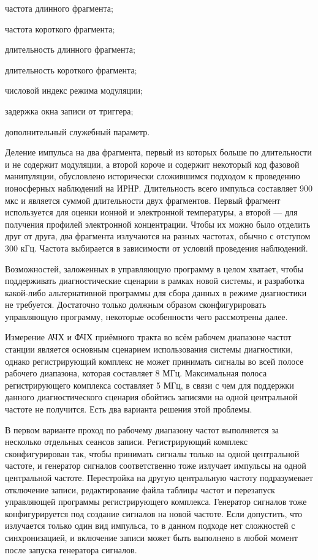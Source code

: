 \documentclass{report}
\begin{document}
\begin{enummarker}
    \item частота длинного фрагмента;
    \item частота короткого фрагмента;
    \item длительность длинного фрагмента;
    \item длительность короткого фрагмента;
    \item числовой индекс режима модуляции;
    \item задержка окна записи от триггера;
    \item дополнительный служебный параметр.
\end{enummarker}

Деление импульса на два фрагмента, первый из которых больше по длительности и не содержит модуляции, а второй короче и содержит некоторый код фазовой манипуляции, обусловлено исторически сложившимся подходом к проведению ионосферных наблюдений на ИРНР. Длительность всего импульса составляет 900 мкс и является суммой длительности двух фрагментов. Первый фрагмент используется для оценки ионной и электронной температуры, а второй --- для получения профилей электронной концентрации. Чтобы их можно было отделить друг от друга, два фрагмента излучаются на разных частотах, обычно с отступом 300 кГц. Частота выбирается в зависимости от условий проведения наблюдений.

Возможностей, заложенных в управляющую программу в целом хватает, чтобы поддерживать диагностические сценарии в рамках новой системы, и разработка какой-либо альтернативной программы для сбора данных в режиме диагностики не требуется. Достаточно только должным образом сконфигурировать управляющую программу, некоторые особенности чего рассмотрены далее.

Измерение АЧХ и ФЧХ приёмного тракта во всём рабочем диапазоне частот станции является основным сценарием использования системы диагностики, однако регистрирующий комплекс не может принимать сигналы во всей полосе рабочего диапазона, которая составляет 8 МГц. Максимальная полоса регистрирующего комплекса составляет 5 МГц, в связи с чем для поддержки данного диагностического сценария обойтись записями на одной центральной частоте не получится. Есть два варианта решения этой проблемы.

В первом варианте проход по рабочему диапазону частот выполняется за несколько отдельных сеансов записи. Регистрирующий комплекс сконфигурирован так, чтобы принимать сигналы только на одной центральной частоте, и генератор сигналов соответственно тоже излучает импульсы на одной центральной частоте. Перестройка на другую центральную частоту подразумевает отключение записи, редактирование файла таблицы частот и перезапуск управляющей программы регистрирующего комплекса. Генератор сигналов тоже конфигурируется под создание сигналов на новой частоте. Если допустить, что излучается только один вид импульса, то в данном подходе нет сложностей с синхронизацией, и включение записи может быть выполнено в любой момент после запуска генератора сигналов.
\end{document}

